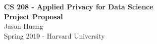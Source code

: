 \documentclass[12pt]{article}
\begin{document}
\begin{center}
	{\Large \textbf{CS 208 - Applied Privacy for Data Science}}\\
	{\Large \textbf{Project Proposal}}\\
	\vspace*{0.1in}
	Jason Huang\\
	Spring 2019 - Harvard University\\
\end{center}

\end{document}
